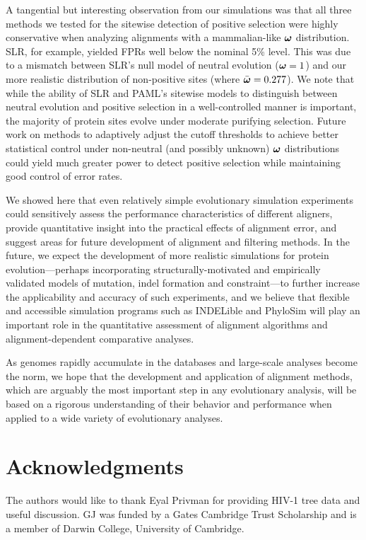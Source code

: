 \documentclass{article}
\begin{document}
A tangential but interesting observation from our simulations was that
all three methods we tested for the sitewise detection of positive
selection were highly conservative when analyzing alignments with a
mammalian-like $\bm{\omega}$ distribution. SLR, for example, yielded FPRs
well below the nominal 5\% level. This was due to a mismatch between
SLR's null model of neutral evolution ($\bm{\omega}=1$) and our more
realistic distribution of non-positive sites (where
$\bar{\bm{\omega}}=0.277$). We note that while the ability of SLR and PAML's
sitewise models to distinguish between neutral evolution and positive
selection in a well-controlled manner is important, the majority of
protein sites evolve under moderate purifying selection. Future work
on methods to adaptively adjust the cutoff thresholds to achieve
better statistical control under non-neutral (and possibly unknown)
$\bm{\omega}$ distributions could yield much greater power to detect positive
selection while maintaining good control of error rates.

We showed here that even relatively simple evolutionary simulation
experiments could sensitively assess the performance characteristics
of different aligners, provide quantitative insight into the practical
effects of alignment error, and suggest areas for future development
of alignment and filtering methods. In the future, we expect the
development of more realistic simulations for protein
evolution---perhaps incorporating structurally-motivated and
empirically validated models of mutation, indel formation and
constraint---to further increase the applicability and accuracy of
such experiments, and we believe that flexible and accessible
simulation programs such as INDELible \citep{Fletcher2009INDELible}
and PhyloSim \citep{Sipos2011PhyloSim} will play an important role in
the quantitative assessment of alignment algorithms and
alignment-dependent comparative analyses.

As genomes rapidly accumulate in the databases and
large-scale analyses become the norm, we hope that the development and
application of alignment methods, which are arguably the most
important step in any evolutionary analysis, will be based on a
rigorous understanding of their behavior and performance when applied
to a wide variety of evolutionary analyses.

\section*{Acknowledgments}

The authors would like to thank Eyal Privman for providing HIV-1 tree
data and useful discussion. GJ was funded by a Gates Cambridge Trust
Scholarship and is a member of Darwin College, University of
Cambridge.

 \fontsize{9}{10}\selectfont%

\end{document}
